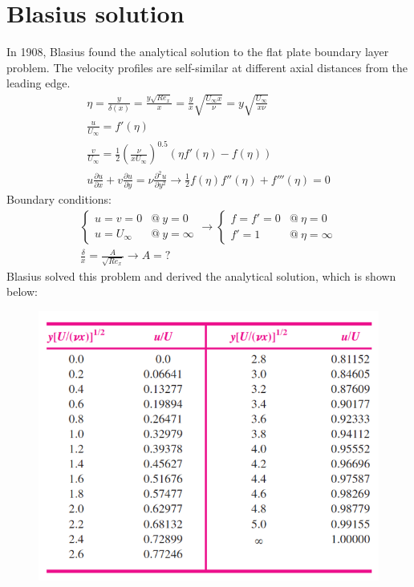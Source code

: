 \documentclass[class=report, crop=false, 12pt,a4paper]{standalone}
\begin{document}
\section{Blasius solution}
In 1908, Blasius found the analytical solution to the flat plate boundary layer problem. The velocity profiles are self-similar at different axial distances from the leading edge.
\begin{gather}
  \eta = \frac{y}{\delta (x)} = \frac{y\sqrt{Re_x}}{x} = \frac{y}{x} \sqrt{\frac{U_\infty x}{\nu}} = y\sqrt{\frac{U_\infty}{x\nu}}\\
  \frac{u}{U_\infty} = f'(\eta)\\
  \frac{v}{U_\infty} = \frac{1}{2} \left( \frac{\nu}{x U_\infty} \right)^{0.5} \left(\eta f'(\eta) - f (\eta)\right)\\
  u \frac{\partial u}{\partial x} + v\frac{\partial u}{\partial y} = \nu \frac{\partial^2 u}{\partial y^2} \rightarrow \frac{1}{2} f(\eta) f''(\eta)+f'''(\eta) = 0
\end{gather}
Boundary conditions:
\begin{gather}
  \begin{cases}
    u = v = 0 & @\  y = 0\\
    u = U_\infty & @\ y = \infty
  \end{cases}\rightarrow \begin{cases}
    f = f' = 0 & @ \ \eta = 0\\
    f' = 1 & @ \ \eta = \infty
  \end{cases}\\
  \frac{\delta}{x} = \frac{A}{\sqrt{Re_x}} \rightarrow A = ?
\end{gather}
Blasius solved this problem and derived the analytical solution, which is shown below:
\begin{figure}[H]
  \centering
  \includegraphics[width = 0.6 \textwidth]{../img/diagram68.png}
  \caption{}
\end{figure}
\end{document}
